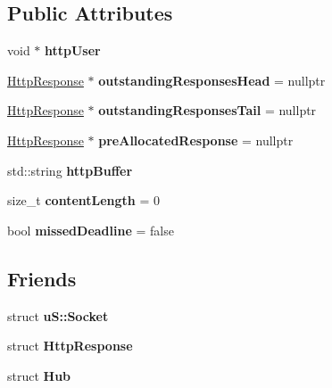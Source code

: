 \subsection*{Public Attributes}
\begin{DoxyCompactItemize}
\item 
\mbox{\label{structu_w_s_1_1_http_socket_aff14ec1a076ddd32a8eb37f4471db2d5}} 
void $\ast$ {\bfseries http\+User}
\item 
\mbox{\label{structu_w_s_1_1_http_socket_ae9cc2d77c48468ea14609a071a86653d}} 
\mbox{\hyperlink{structu_w_s_1_1_http_response}{Http\+Response}} $\ast$ {\bfseries outstanding\+Responses\+Head} = nullptr
\item 
\mbox{\label{structu_w_s_1_1_http_socket_a5ac3a523c28016cbf31a3a2a56561a06}} 
\mbox{\hyperlink{structu_w_s_1_1_http_response}{Http\+Response}} $\ast$ {\bfseries outstanding\+Responses\+Tail} = nullptr
\item 
\mbox{\label{structu_w_s_1_1_http_socket_aa6aaabb48a64471b8fd1185a745e2dab}} 
\mbox{\hyperlink{structu_w_s_1_1_http_response}{Http\+Response}} $\ast$ {\bfseries pre\+Allocated\+Response} = nullptr
\item 
\mbox{\label{structu_w_s_1_1_http_socket_a8b9905f5b2333d2e73681fb996e1e36a}} 
std\+::string {\bfseries http\+Buffer}
\item 
\mbox{\label{structu_w_s_1_1_http_socket_a7743b5628fc48a5d795882d7a5fc9787}} 
size\+\_\+t {\bfseries content\+Length} = 0
\item 
\mbox{\label{structu_w_s_1_1_http_socket_a9063050af3c964c0f7639a8e6408553c}} 
bool {\bfseries missed\+Deadline} = false
\end{DoxyCompactItemize}
\subsection*{Friends}
\begin{DoxyCompactItemize}
\item 
\mbox{\label{structu_w_s_1_1_http_socket_aa3516c90697652732deaa6ba9bfb375b}} 
struct {\bfseries u\+S\+::\+Socket}
\item 
\mbox{\label{structu_w_s_1_1_http_socket_af0957378717f7133c9f634370cca6294}} 
struct {\bfseries Http\+Response}
\item 
\mbox{\label{structu_w_s_1_1_http_socket_af20bcb1dd4e741f2423d470bb4cd994d}} 
struct {\bfseries Hub}
\end{DoxyCompactItemize}
